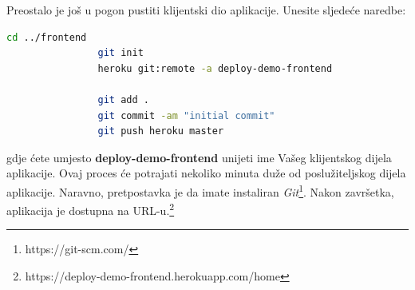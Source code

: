 			Preostalo je još u pogon pustiti klijentski dio aplikacije. Unesite sljedeće naredbe:
			\begin{lstlisting}[language=bash]
				cd ../frontend
				git init
				heroku git:remote -a deploy-demo-frontend
				
				git add .
				git commit -am "initial commit"
				git push heroku master
			\end{lstlisting}
			gdje ćete umjesto \textbf{deploy-demo-frontend} unijeti ime Vašeg klijentskog dijela aplikacije. Ovaj proces će potrajati nekoliko minuta duže od poslužiteljskog dijela aplikacije. Naravno, pretpostavka je da imate instaliran \textit{Git}\footnote{https://git-scm.com/}.
			Nakon završetka, aplikacija je dostupna na URL-u.\footnote{https://deploy-demo-frontend.herokuapp.com/home}
			
			\eject 